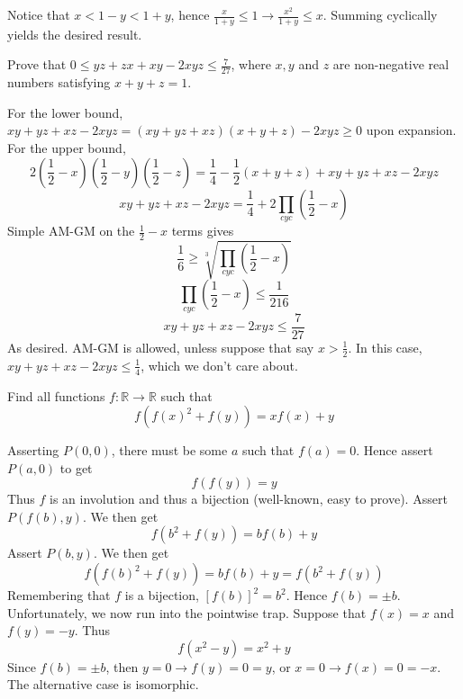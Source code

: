 \documentclass[11pt]{scrartcl}
\begin{document}
\begin{soln}
  Notice that $x<1-y<1+y$, hence $\frac{x}{1+y}\le 1\to \frac{x^2}{1+y}\le x$. Summing cyclically yields the desired result.
\end{soln}
\begin{example}
  [IMO 1984]
  Prove that $0\le yz+zx+xy-2xyz\le{\frac{7}{27}}$, where $x,y$ and $z$ are non-negative real numbers satisfying $x+y+z=1$.
\end{example}
\begin{soln}
  For the lower bound, $xy+yz+xz-2xyz=(xy+yz+xz)(x+y+z)-2xyz\ge 0$ upon expansion.
  For the upper bound,
  $$2\left(\frac{1}{2}-x\right)\left(\frac{1}{2}-y\right)\left(\frac{1}{2}-z\right)=\frac{1}{4}-\frac{1}{2}(x+y+z)+xy+yz+xz-2xyz$$
  $$xy+yz+xz-2xyz=\frac{1}{4}+2\prod_{cyc}\left(\frac{1}{2}-x\right)$$
  Simple AM-GM on the $\frac{1}{2}-x$ terms gives
  $$\frac{1}{6}\ge \sqrt[3]{\prod_{cyc}\left(\frac{1}{2}-x\right)}$$
  $$\prod_{cyc}\left(\frac{1}{2}-x\right)\le \frac{1}{216}$$
  $$xy+yz+xz-2xyz\le \frac{7}{27}$$
  As desired. AM-GM is allowed, unless suppose that say $x>\frac{1}{2}$.
  In this case, $xy+yz+xz-2xyz\le \frac{1}{4}$, which we don't care about.
\end{soln}
\begin{example}
  [Kyrgyzstan]
  Find all functions $f:\mathbb{R}\to \mathbb{R}$ such that
  $$f(f(x)^2+f(y))=xf(x)+y$$
\end{example}
\begin{soln}
  Asserting $P(0,0)$, there must be some $a$ such that $f(a)=0$.
  Hence assert $P(a,0)$ to get
  $$f(f(y))=y$$
  Thus $f$ is an involution and thus a bijection (well-known, easy to prove).
  Assert $P(f(b), y)$. We then get
  $$f(b^2+f(y))=bf(b)+y$$
  Assert $P(b,y)$. We then get
  $$f(f(b)^2+f(y))=bf(b)+y=f(b^2+f(y))$$
  Remembering that $f$ is a bijection, $[f(b)]^2=b^2$. Hence $f(b)=\pm b$.
  Unfortunately, we now run into the pointwise trap.
  Suppose that $f(x)=x$ and $f(y)=-y$. Thus
  $$f(x^2-y)=x^2+y$$
  Since $f(b)=\pm b$, then $y=0\to f(y)=0=y$, or $x=0\to f(x)=0=-x$.
  The alternative case is isomorphic.
\end{soln}
\end{document}
